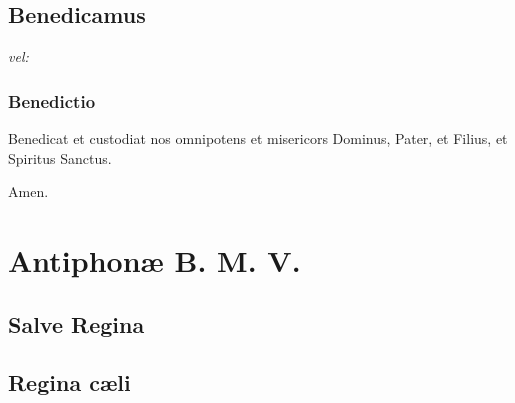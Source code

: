 \section*{Benedicamus}
\par
\textit{vel:}\par
{}
\par
\subsection*{Benedictio}
\Vbar Benedicat et custodiat nos omnipotens et misericors Dominus, \grecross Pater, et Filius, et Spiritus Sanctus.\par
\Rbar Amen.
\begin{center}
{\centering{\scalebox{3}{\grecross}}}
\end{center}
\chapter{Antiphonæ B. M. V.}
\def\gebet{\textsc{Marienantiphonen}}
\section*{Salve Regina}\par
{}
\newpage
\section*{Regina cæli}\par
{}
\par
\begin{center}
{\centering{\scalebox{3}{\grecross}}}
\end{center}